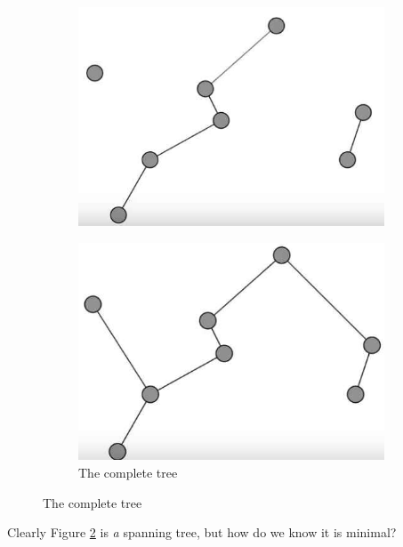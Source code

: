 \documentclass[]{article}
\begin{document}
\begin{figure}[H]
\begin{subfigure}[b]{0.45\textwidth}
		\includegraphics[width=\textwidth]{mst3}
	\end{subfigure}
	\;\;\;
	\begin{subfigure}[b]{0.45\textwidth}
		\caption{The complete tree}\label{fig:mst4}
		\includegraphics[width=\textwidth]{mst4}
	\end{subfigure}
\end{figure}

Clearly Figure \ref{fig:mst4} is \emph{a} spanning tree, but how do we know it is minimal?
\end{document}
